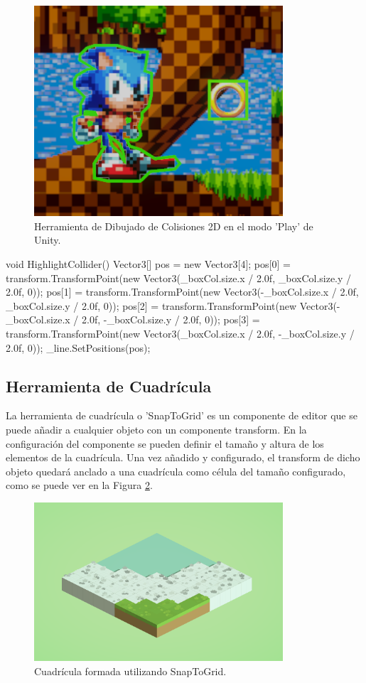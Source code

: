 \begin{figure}[H]
  \centering
    \includegraphics[width=350px,clip=true]{debug2d.png}
  \caption{Herramienta de Dibujado de Colisiones 2D en el modo 'Play' de Unity.}
  \label{fig:debug2d}
\end{figure}

\begin{mypython}[caption={Algoritmo para pintar un box collider 2D.},label={alg:debugbox2d}]
    void HighlightCollider()
    {
        Vector3[] pos = new Vector3[4];
        pos[0] = transform.TransformPoint(new Vector3(_boxCol.size.x / 2.0f, _boxCol.size.y / 2.0f, 0));
        pos[1] = transform.TransformPoint(new Vector3(-_boxCol.size.x / 2.0f, _boxCol.size.y / 2.0f, 0));
        pos[2] = transform.TransformPoint(new Vector3(-_boxCol.size.x / 2.0f, -_boxCol.size.y / 2.0f, 0));
        pos[3] = transform.TransformPoint(new Vector3(_boxCol.size.x / 2.0f, -_boxCol.size.y / 2.0f, 0));
        _line.SetPositions(pos);
    }
\end{mypython}

\subsection{Herramienta de Cuadrícula}
La herramienta de cuadrícula o 'SnapToGrid' es un componente de editor que se puede añadir a cualquier objeto con un componente transform. En la configuración del componente
 se pueden definir el tamaño y altura de los elementos de la cuadrícula. Una vez añadido y configurado, el transform de dicho objeto quedará anclado a una cuadrícula como 
 célula del tamaño configurado, como se puede ver en la Figura \ref{fig:snaptogrid}.

 \begin{figure}[H]
  \centering
    \includegraphics[width=350px,clip=true]{snaptogrid.png}
  \caption{Cuadrícula formada utilizando SnapToGrid.}
  \label{fig:snaptogrid}
\end{figure}

